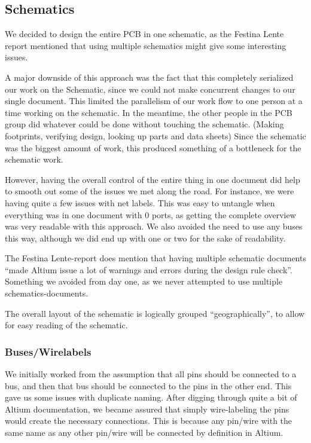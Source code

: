 \subsection {Schematics}

We decided to design the entire \ac{PCB} in one schematic, as the Festina Lente
report mentioned that using multiple schematics might give
some interesting issues.

A major downside of this approach was the fact that this completely serialized
our work on the Schematic, since we could not make concurrent changes to our
single document. This limited the parallelism of our work flow to one person at a
time working on the schematic.  In the meantime, the other people in the
\ac{PCB} group did whatever could be done without touching the
schematic. (Making footprints, verifying design, looking up parts and data
sheets) Since the schematic was the biggest amount of work, this produced
something of a bottleneck for the schematic work.

However, having the overall control of the entire thing in one document
did help to smooth out some of the issues we met along the road. For instance,
we were having quite a few issues with net labels. This was easy to
untangle when everything was in one document with 0 ports, as getting the
complete overview was very readable with this approach. We also avoided the need
to use any buses this way, although we did end up with one or two for the sake
of readability.

  The
Festina Lente-report does mention that having multiple schematic documents
``made Altium issue a lot of warnings and errors during the design rule
check''\cite[p.~49]{berg2011festinalente}. Something we avoided from day one, as
we never attempted to use multiple schematics-documents. 

The overall layout of the schematic is logically grouped ``geographically'', to
allow for easy reading of the schematic.

\subsubsection {Buses/Wirelabels}
We initially worked from the assumption that all pins should be connected to a
bus, and then that bus should be connected to the pins in the other end. This
gave us some issues with duplicate naming. After digging through quite a bit of
Altium documentation, we became assured that simply wire-labeling the pins
would create the necessary connections. This is because any pin/wire with the
same name as any other pin/wire will be connected by definition in Altium.

